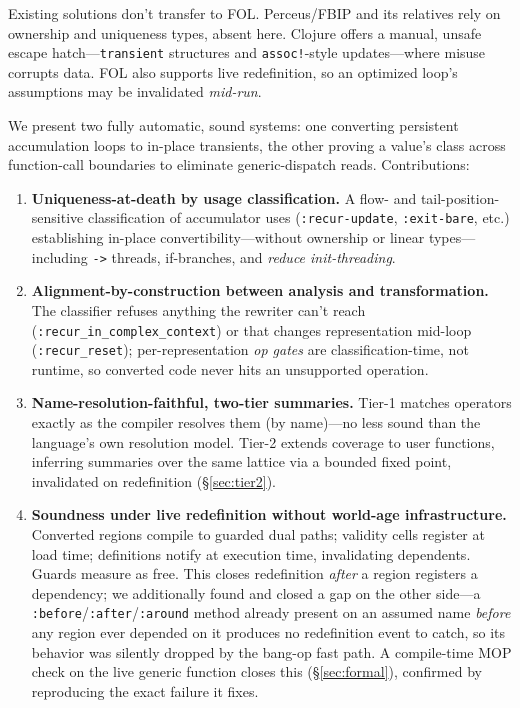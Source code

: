 \documentclass[sigplan,review,anonymous]{acmart}
\begin{document}
Existing solutions don't transfer to FOL. Perceus/FBIP \cite{reinking2021perceus} and its relatives \cite{lorenzen2023functional} rely on ownership and uniqueness types, absent here. Clojure \cite{hickey2009clojure} offers a manual, unsafe escape hatch---\texttt{transient} structures and \texttt{assoc!}-style updates---where misuse corrupts data. FOL also supports live redefinition, so an optimized loop's assumptions may be invalidated \emph{mid-run}.

We present two fully automatic, sound systems: one converting persistent accumulation loops to in-place transients, the other proving a value's class across function-call boundaries to eliminate generic-dispatch reads. Contributions:

\begin{enumerate}
    \item \textbf{Uniqueness-at-death by usage classification.} A flow- and tail-position-sensitive classification of accumulator uses (\texttt{:recur-update}, \texttt{:exit-bare}, etc.) establishing in-place convertibility---without ownership or linear types---including \texttt{->} threads, if-branches, and \emph{reduce init-threading}.
    \item \textbf{Alignment-by-construction between analysis and transformation.} The classifier refuses anything the rewriter can't reach (\texttt{:recur\_in\_complex\_context}) or that changes representation mid-loop (\texttt{:recur\_reset}); per-representation \emph{op gates} are classification-time, not runtime, so converted code never hits an unsupported operation.
    \item \textbf{Name-resolution-faithful, two-tier summaries.} Tier-1 matches operators exactly as the compiler resolves them (by name)---no less sound than the language's own resolution model. Tier-2 extends coverage to user functions, inferring summaries over the same lattice via a bounded fixed point, invalidated on redefinition (§\ref{sec:tier2}).
    \item \textbf{Soundness under live redefinition without world-age infrastructure.} Converted regions compile to guarded dual paths; validity cells register at load time; definitions notify at execution time, invalidating dependents. Guards measure as free. This closes redefinition \emph{after} a region registers a dependency; we additionally found and closed a gap on the other side---a \texttt{:before}/\texttt{:after}/\texttt{:around} method already present on an assumed name \emph{before} any region ever depended on it produces no redefinition event to catch, so its behavior was silently dropped by the bang-op fast path. A compile-time MOP check on the live generic function closes this (§\ref{sec:formal}), confirmed by reproducing the exact failure it fixes.

\end{enumerate}
\end{document}

